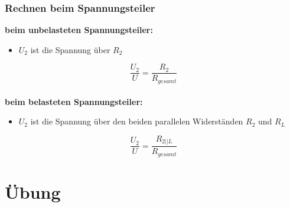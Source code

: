 \begin{frame}
	\frametitle{Rechnen beim Spannungsteiler}
	\textbf{beim unbelasteten Spannungsteiler:}
	\begin{itemize}
		\item $U_2$ ist die Spannung über $R_2$ 
	\end{itemize}
	\vspace{1mm}
	$$\frac{U_2}{U} = \frac{R_2}{R_{gesamt}}$$\\
	\vspace{2mm}
	\textbf{beim belasteten Spannungsteiler:}
	\begin{itemize}
		\item $U_2$ ist die Spannung über den beiden parallelen Widerständen $R_2$ und $R_L$
	\end{itemize}
	\vspace{1mm}
	$$\frac{U_2}{U} = \frac{R_{2||L}}{R_{gesamt}}$$
\end{frame}

\section{Übung}

